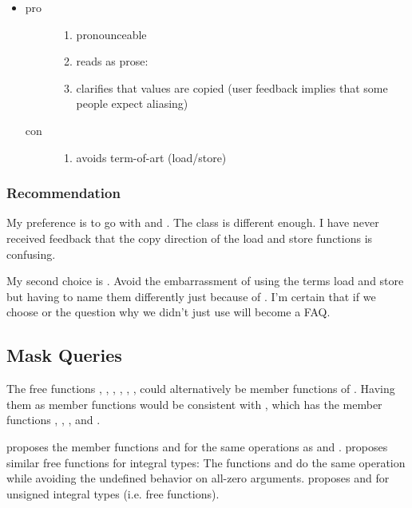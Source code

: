 \begin{itemize}
  \item {}
    \begin{description}
      \item[pro]
        \begin{enumerate}
          \item pronounceable
          \item reads as prose: 
          \item clarifies that values are copied
            (user feedback implies that some people expect aliasing)
        \end{enumerate}
      \item[con]
        \begin{enumerate}
          \item avoids term-of-art (load/store)
        \end{enumerate}
    \end{description}

\end{itemize}

\subsubsection{Recommendation}
My preference is to go with  and .
The  class is different enough.
I have never received feedback that the copy direction of the load and store functions is confusing.

My second choice is .
Avoid the embarrassment of using the terms load and store but having to name them differently just because of .
I'm certain that if we choose  or  the question why we didn't just use  will become a FAQ.

\subsection{Mask Queries}\label{sec:mask queries}
The free functions , , , , , ,  could alternatively be member functions of \mask.
Having them as member functions would be consistent with , which has the member functions , , , and .

\textcite{P0161R0} proposes the  member functions  and  for the same operations as  and .
\textcite{N3864} proposes similar free functions for integral types:
The functions  and  do the same operation while avoiding the undefined behavior on all-zero arguments.
\textcite{P0553R1} proposes  and  for unsigned integral types (i.e. free functions).

